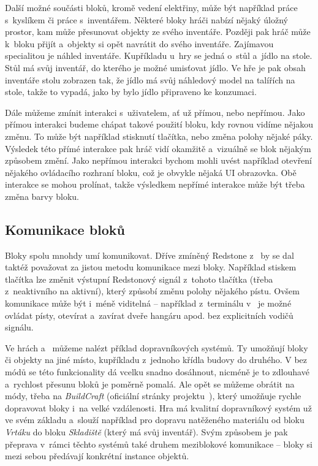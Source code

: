 Další možné součásti bloků, kromě vedení elektřiny, může být například práce s~kyslíkem či práce s~inventářem. Některé bloky hráči nabízí nějaký úložný prostor, kam může přesunovat objekty ze svého inventáře. Později pak hráč může k~bloku přijít a~objekty si opět navrátit do svého inventáře. Zajímavou specialitou je náhled inventáře. Kupříkladu u~hry \ME{} se jedná o~stůl a~jídlo na stole. Stůl má svůj inventář, do kterého je možné umisťovat jídlo. Ve hře je pak obsah inventáře stolu zobrazen tak, že jídlo má svůj náhledový model na talířích na stole, takže to vypadá, jako by bylo jídlo připraveno ke konzumaci. 


Dále můžeme zmínit interakci s~uživatelem, ať už přímou, nebo nepřímou. Jako přímou interakci budeme chápat takové použití bloku, kdy rovnou vidíme nějakou změnu. To může být například stisknutí tlačítka, nebo změna polohy nějaké páky. Výsledek této přímé interakce pak hráč vidí okamžitě a~vizuálně se blok nějakým způsobem změní. Jako nepřímou interakci bychom mohli uvést například otevření nějakého ovládacího rozhraní bloku, což je obvykle nějaká UI obrazovka. Obě interakce se mohou prolínat, takže výsledkem nepřímé interakce může být třeba změna barvy bloku.


\subsection{Komunikace bloků}
Bloky spolu mnohdy umí komunikovat. Dříve zmíněný Redstone z~ by se dal taktéž považovat za jistou metodu komunikace mezi bloky. Například stiskem tlačítka lze změnit výstupní Redstonový signál z~tohoto tlačítka (třeba z~neaktivního na aktivní), který způsobí změnu polohy nějakého pístu. Ovšem komunikace může být i~méně viditelná -- například z~terminálu v~\SE{} je možné ovládat písty, otevírat a~zavírat dveře hangáru apod. bez explicitních vodičů signálu.

Ve hrách \MC{} a~\SE{} můžeme nalézt příklad dopravníkových systémů. Ty umožňují  bloky či objekty na jiné místo, kupříkladu z~jednoho křídla budovy do druhého. V  bez módů se této funkcionality dá vcelku snadno dosáhnout, nicméně je to zdlouhavé a~rychlost přesunu bloků je poměrně pomalá. Ale opět se můžeme obrátit na módy, třeba na \textit{BuildCraft} (oficiální stránky projektu~\citep{buildcraft}), který umožňuje rychle dopravovat bloky i~na velké vzdálenosti. Hra \SE{} má kvalitní dopravníkový systém už ve svém základu a~slouží například pro dopravu natěženého materiálu od bloku \textit{Vrtáku} do bloku \textit{Skladiště} (který má svůj inventář). Svým způsobem je pak přeprava v~rámci těchto systémů také druhem meziblokové komunikace -- bloky si mezi sebou předávají konkrétní instance objektů.


